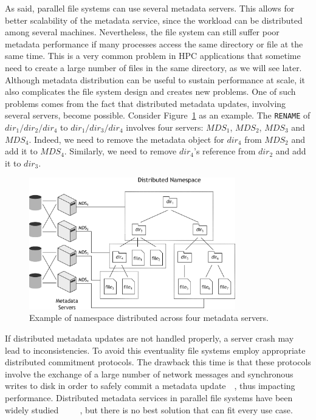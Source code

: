 As said, parallel file systems can use several metadata servers. This allows for better scalability of the metadata service, since the workload can be distributed among several machines. Nevertheless, the file system can 
still suffer poor metadata performance if many processes access the same directory or file at the same time. This is a very common problem in HPC applications that sometime need to create a large number of files in the same
directory, as we will see later. Although metadata distribution can be useful to sustain performance at scale, it also complicates the file system design and creates new problems. One of such problems comes from the fact that 
distributed metadata updates, involving several servers, become possible. Consider Figure~\ref{figure: namespace} as an example. The \texttt{RENAME} of $dir_1/dir_2/dir_4$ to $dir_1/dir_3/dir_4$ involves four servers: $MDS_1$, 
$MDS_2$, $MDS_3$ and $MDS_4$. Indeed, we need to remove the metadata object for $dir_4$ from $MDS_2$ and add it to $MDS_4$. Similarly, we need to remove $dir_4$'s reference from $dir_2$ and add it to $dir_3$.

\begin{figure}[!htb]
\centering
\includegraphics[width=0.8\textwidth]{figures/namespace}
\caption{Example of namespace distributed across four metadata servers.}
\label{figure: namespace}
\end{figure}

If distributed metadata updates are not handled properly, a server crash may lead to inconsistencies. To avoid this eventuality file systems employ appropriate distributed commitment protocols. The drawback this time 
is that these protocols involve the exchange of a large number of network messages and synchronous writes to disk in order to safely commit a metadata update~\cite{Stamos1990}~\cite{Gray2006}, thus impacting performance. 
Distributed metadata services in parallel file systems have been widely studied~\cite{Zhang2001}~\cite{Fan2004}~\cite{Michalak2005}~\cite{Sinnamohideen2010}~\cite{Congiu2012}, but there is no best solution that can fit 
every use case.

